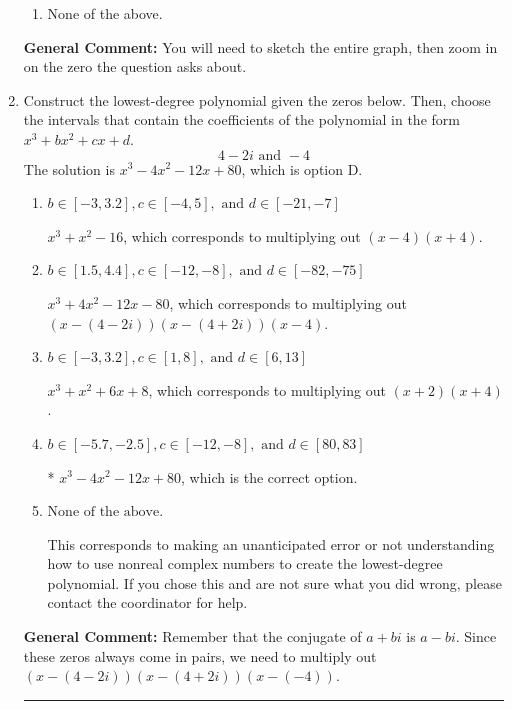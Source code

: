\documentclass{extbook}[14pt]
\newcommand{\litem}[1]{\item #1

\rule{\textwidth}{0.4pt}}
\begin{document}
\begin{enumerate}
{\begin{enumerate}[label=\Alph*.]
\item None of the above.\end{enumerate}
\textbf{General Comment:} You will need to sketch the entire graph, then zoom in on the zero the question asks about.
}
\litem{
Construct the lowest-degree polynomial given the zeros below. Then, choose the intervals that contain the coefficients of the polynomial in the form $x^3+bx^2+cx+d$.
\[ 4 - 2 i \text{ and } -4 \]
The solution is \( x^{3} -4 x^{2} -12 x + 80 \), which is option D.\begin{enumerate}[label=\Alph*.]
\item \( b \in [-3, 3.2], c \in [-4, 5], \text{ and } d \in [-21, -7] \)

$x^{3} + x^{2} -16$, which corresponds to multiplying out $(x -4)(x + 4)$.
\item \( b \in [1.5, 4.4], c \in [-12, -8], \text{ and } d \in [-82, -75] \)

$x^{3} +4 x^{2} -12 x -80$, which corresponds to multiplying out $(x-(4 - 2 i))(x-(4 + 2 i))(x -4)$.
\item \( b \in [-3, 3.2], c \in [1, 8], \text{ and } d \in [6, 13] \)

$x^{3} + x^{2} +6 x + 8$, which corresponds to multiplying out $(x + 2)(x + 4)$.
\item \( b \in [-5.7, -2.5], c \in [-12, -8], \text{ and } d \in [80, 83] \)

* $x^{3} -4 x^{2} -12 x + 80$, which is the correct option.
\item \( \text{None of the above.} \)

This corresponds to making an unanticipated error or not understanding how to use nonreal complex numbers to create the lowest-degree polynomial. If you chose this and are not sure what you did wrong, please contact the coordinator for help.
\end{enumerate}

\textbf{General Comment:} Remember that the conjugate of $a+bi$ is $a-bi$. Since these zeros always come in pairs, we need to multiply out $(x-(4 - 2 i))(x-(4 + 2 i))(x-(-4))$.
}
\end{enumerate}
\end{document}
